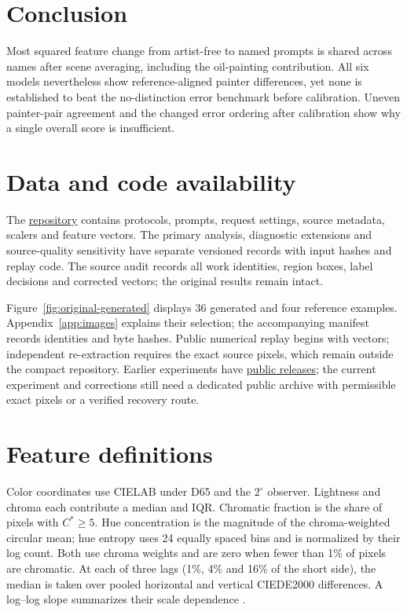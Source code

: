 \documentclass[11pt]{article}
\begin{document}
\section{Conclusion}
Most squared feature change from artist-free to named prompts is shared across
names after scene averaging, including the oil-painting contribution.
All six models nevertheless show reference-aligned painter differences, yet none
is established to beat the no-distinction error benchmark before calibration.
Uneven painter-pair agreement and the changed error ordering after calibration
show why a single overall score is insufficient.

\section*{Data and code availability}
The \href{https://github.com/isingmodel/latent-art-bench}{repository} contains
protocols, prompts, request settings, source metadata, scalers and feature
vectors. The primary analysis, diagnostic extensions and source-quality
sensitivity have separate versioned records with input hashes and replay code.
The source audit records all work identities, region boxes, label decisions
and corrected vectors; the original results remain intact.

Figure~\ref{fig:original-generated} displays 36 generated and four reference
examples. Appendix~\ref{app:images} explains their
selection; the accompanying manifest records identities and byte hashes. Public numerical replay begins with
vectors; independent re-extraction requires the exact source pixels, which
remain outside the compact repository. Earlier experiments have
\href{https://github.com/isingmodel/latent-art-bench/releases}{public releases};
the current experiment and corrections still need a dedicated public archive
with permissible exact pixels or a verified recovery route.




\appendix
\section{Feature definitions}\label{app:features}
Color coordinates use CIELAB under D65 and the $2^\circ$ observer. Lightness
and chroma each contribute a median and IQR. Chromatic fraction is the share
of pixels with $C^*\geq5$. Hue concentration is the magnitude of the
chroma-weighted circular mean; hue entropy uses 24 equally spaced bins and is
normalized by their log count. Both use chroma weights and are zero when fewer
than 1\% of pixels are chromatic. At each of three lags (1\%, 4\% and 16\% of
the short side), the median is taken over pooled horizontal and vertical
CIEDE2000 differences. A log--log slope summarizes their
scale dependence \citep{sharma2005ciede}.
\end{document}
